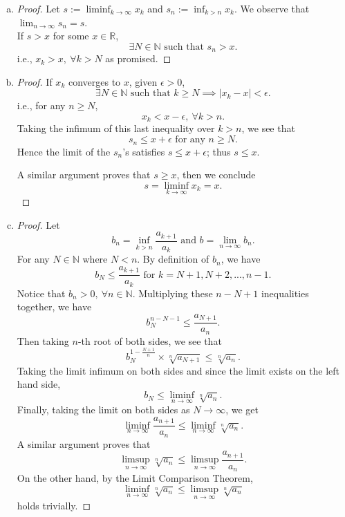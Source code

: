 \begin{Exercise}
\begin{enumerate}[a)]
\item
\begin{proof}
Let $s:=\liminf_{k\to\infty}x_k$ and $s_n := \inf_{k>n}x_k$. We observe that $\lim_{n\to\infty}s_n = s$.\\
If $s>x$ for some $x\in\mathbb{R}$, $$\exists N\in\mathbb{N}\text{ such that } s_n>x.$$ i.e., $x_k>x,\ \forall k > N$ as promised.
\end{proof}

\item
\begin{proof}
If $x_k$ converges to $x$, given $\epsilon > 0$, 
$$
\exists N \in\mathbb{N}\text{ such that } k\geq N \implies \left|x_k-x\right|<\epsilon.$$
i.e., for any $n\geq N$, $$x_k<x-\epsilon,\ \forall k>n.
$$
Taking the infimum of this last inequality over $k>n$, we see that 
$$
s_n\leq x+\epsilon\text{ for any } n\geq N.
$$
Hence the limit of the $s_n$'s satisfies $s\leq x+\epsilon$; thus $s\leq x$.

\vspace{2ex}

A similar argument proves that $s\geq x$, then we conclude
$$
s=\liminf_{k\to\infty}x_k=x.
$$
\end{proof}

\item
\begin{proof}
Let 
$$
b_n 
= \inf_{k>n}\frac{a_{k+1}}{a_k} \text{ and } b 
= \lim_{n\to\infty}b_n.
$$
For any $N\in\mathbb{N}$ where $N<n$. By definition of $b_n$, we have
$$
b_N
\leq\frac{a_{k+1}}{a_k}\text{ for } k=N+1,N+2,...,n-1.
$$
Notice that $b_n>0,\ \forall n\in\mathbb{N}$. Multiplying these $n-N+1$ inequalities together, we have 
$$
b_N^{n-N-1}\leq\frac{a_{N+1}}{a_n}.
$$ 
Then taking $n$-th root of both sides, we see that 
$$
b_N^{1-\frac{N+1}{n}} \times \sqrt[n]{a_{N+1}} 
\leq \sqrt[n]{a_n}.
$$
Taking the limit infimum on both sides and since the limit exists on the left hand side, 
$$
b_N 
\leq \liminf_{n\to\infty}\sqrt[n]{a_n}.
$$
Finally, taking the limit on both sides as $N\to\infty$, we get 
$$
\liminf_{n\to\infty}\frac{a_{n+1}}{a_n} 
\leq \liminf_{n\to\infty}\sqrt[n]{a_n}.
$$
A similar argument proves that
$$
\limsup_{n\to\infty}\sqrt[n]{a_n} 
\leq \limsup_{n\to\infty}\frac{a_{n+1}}{a_n}.
$$
On the other hand, by the Limit Comparison Theorem,
$$
\liminf_{n\to\infty}\sqrt[n]{a_n} 
\leq \limsup_{n\to\infty}\sqrt[n]{a_n}
$$
holds trivially. 


\end{proof}
\end{enumerate}
\end{Exercise}
